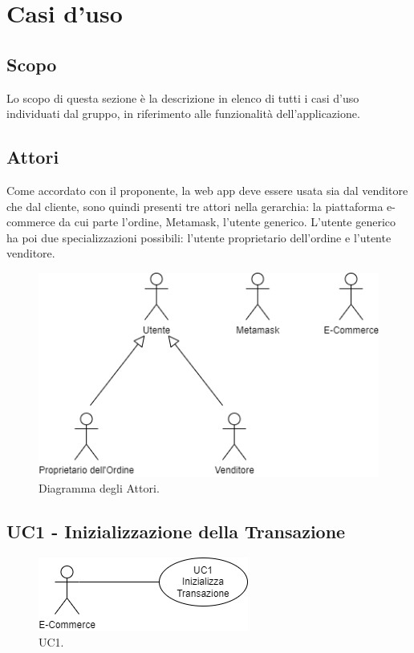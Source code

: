 \section{Casi d'uso} \label{section:casi_uso}

\subsection{Scopo}
Lo scopo di questa sezione è la descrizione in elenco di tutti i casi d'uso individuati dal gruppo, in
riferimento alle funzionalità dell'applicazione.

\subsection{Attori}
Come accordato con il proponente, la web app\glo{} deve essere usata sia dal venditore che dal cliente,
sono quindi presenti tre attori nella gerarchia: la piattaforma e-commerce\glo{} da cui parte l'ordine, Metamask\glo{}, l'utente generico.
L'utente generico ha poi due specializzazioni possibili: l'utente proprietario dell'ordine e l'utente venditore.

\begin{figure}[H]
    \centering
    \includegraphics[scale=0.7]{immagini/UseCases-Attori.png}
    \caption{Diagramma degli Attori.}
\end{figure}

\subsection{UC1 - Inizializzazione della Transazione}\label{subsection: UC1}

\begin{figure}[H]
    \centering
    \includegraphics[scale=0.7]{immagini/UseCases-UC1.png}
    \caption{UC1.}
\end{figure}

